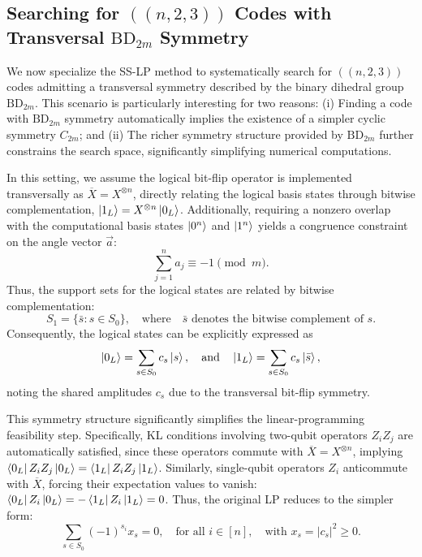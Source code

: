 \documentclass[8pt]{article}
\theoremstyle{definition}
\begin{document}
\subsection{Searching for \texorpdfstring{$((n,2,3))$}{((n,2,3))} Codes with Transversal \texorpdfstring{$\mathrm{BD}_{2m}$}{BD₂ₘ} Symmetry}

We now specialize the SS-LP method to systematically search for $((n,2,3))$ codes admitting a transversal symmetry described by the binary dihedral group $\mathrm{BD}_{2m}$. This scenario is particularly interesting for two reasons: (i) Finding a code with $\mathrm{BD}_{2m}$ symmetry automatically implies the existence of a simpler cyclic symmetry $C_{2m}$; and (ii) The richer symmetry structure provided by $\mathrm{BD}_{2m}$ further constrains the search space, significantly simplifying numerical computations.


In this setting, we assume the logical bit-flip operator is implemented transversally as $\overline{X} = X^{\otimes n}$, directly relating the logical basis states through bitwise complementation, $\ket{1_L} = X^{\otimes n}\ket{0_L}$. Additionally, requiring a nonzero overlap with the computational basis states $\ket{0^n}$ and $\ket{1^n}$ yields a congruence constraint on the angle vector $\vec{a}$:
\begin{equation}\label{eq:a-congruence}
    \sum_{j=1}^n a_j \equiv -1 \pmod{m}.
\end{equation}
Thus, the support sets for the logical states are related by bitwise complementation:
\[
    S_1 = \{\bar{s} : s \in S_0\},\quad\text{where}\quad \bar{s}\text{ denotes the bitwise complement of } s.
\]
Consequently, the logical states can be explicitly expressed as
\[
    \ket{0_L}=\sum_{s\in S_0} c_s\ket{s},\quad\text{and}\quad \ket{1_L}=\sum_{s\in S_0} c_s\ket{\bar s},
\]
noting the shared amplitudes $c_s$ due to the transversal bit-flip symmetry.

This symmetry structure significantly simplifies the linear-programming feasibility step. Specifically, KL conditions involving two-qubit operators $Z_iZ_j$ are automatically satisfied, since these operators commute with $\overline{X}=X^{\otimes n}$, implying $\bra{0_L}Z_i Z_j\ket{0_L} = \bra{1_L}Z_i Z_j\ket{1_L}$. Similarly, single-qubit operators $Z_i$ anticommute with $\overline{X}$, forcing their expectation values to vanish: $\bra{0_L}Z_i\ket{0_L} = -\bra{1_L}Z_i\ket{1_L}=0$. Thus, the original LP reduces to the simpler form:
\[
    \sum_{s\in S_0}(-1)^{s_i} x_s = 0,\quad\text{for all } i\in[n],\quad\text{with } x_s = |c_s|^2 \geq 0.
\]
\end{document}
